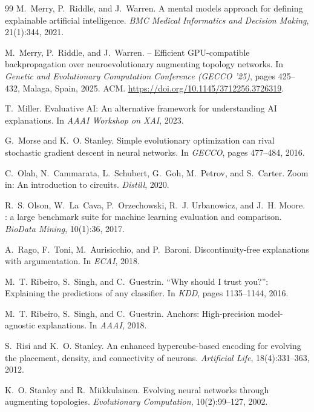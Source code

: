 \documentclass[11pt]{article}
\begin{document}
\begin{thebibliography}{99}
M.~Merry, P.~Riddle, and J.~Warren.
\newblock A mental models approach for defining explainable artificial intelligence.
\newblock \emph{BMC Medical Informatics and Decision Making}, 21(1):344, 2021.

M.~Merry, P.~Riddle, and J.~Warren.
 -- Efficient {GPU}-compatible backpropagation over neuroevolutionary augmenting topology networks.
\newblock In \emph{Genetic and Evolutionary Computation Conference (GECCO '25)}, pages 425--432, Malaga, Spain, 2025. ACM.
\newblock \url{https://doi.org/10.1145/3712256.3726319}.

T.~Miller.
\newblock Evaluative AI: An alternative framework for understanding AI explanations.
\newblock In \emph{AAAI Workshop on XAI}, 2023.

G.~Morse and K.~O. Stanley.
\newblock Simple evolutionary optimization can rival stochastic gradient descent in neural networks.
\newblock In \emph{GECCO}, pages 477--484, 2016.

C.~Olah, N.~Cammarata, L.~Schubert, G.~Goh, M.~Petrov, and S.~Carter.
\newblock Zoom in: An introduction to circuits.
\newblock \emph{Distill}, 2020.

R.~S. Olson, W.~La~Cava, P.~Orzechowski, R.~J. Urbanowicz, and J.~H. Moore.
: a large benchmark suite for machine learning evaluation and comparison.
\newblock \emph{BioData Mining}, 10(1):36, 2017.

A.~Rago, F.~Toni, M.~Aurisicchio, and P.~Baroni.
\newblock Discontinuity-free explanations with argumentation.
\newblock In \emph{ECAI}, 2018.

M.~T. Ribeiro, S.~Singh, and C.~Guestrin.
\newblock ``{Why} should {I} trust you?'': Explaining the predictions of any classifier.
\newblock In \emph{KDD}, pages 1135--1144, 2016.

M.~T. Ribeiro, S.~Singh, and C.~Guestrin.
\newblock Anchors: High-precision model-agnostic explanations.
\newblock In \emph{AAAI}, 2018.

S.~Risi and K.~O. Stanley.
\newblock An enhanced hypercube-based encoding for evolving the placement, density, and connectivity of neurons.
\newblock \emph{Artificial Life}, 18(4):331--363, 2012.

K.~O. Stanley and R.~Miikkulainen.
\newblock Evolving neural networks through augmenting topologies.
\newblock \emph{Evolutionary Computation}, 10(2):99--127, 2002.


\end{thebibliography}
\end{document}
